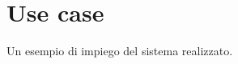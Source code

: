 \chapter{Use case}
\label{appendixE}
\thispagestyle{empty}

\noindent Un esempio di impiego del sistema realizzato.